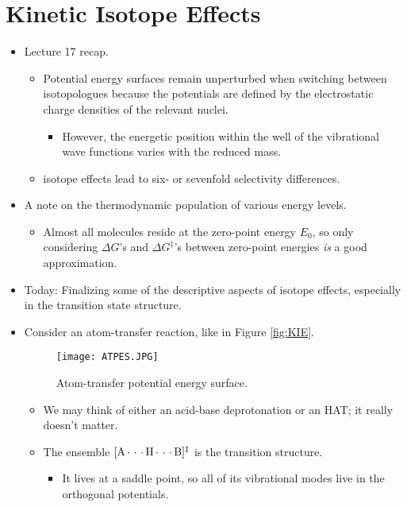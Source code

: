 \documentclass[../notes.tex]{subfiles}
\begin{document}
\section{Kinetic Isotope Effects}
\begin{itemize}
    \item {}Lecture 17 recap.
    \begin{itemize}
        \item Potential energy surfaces remain unperturbed when switching between isotopologues because the potentials are defined by the electrostatic charge densities of the relevant nuclei.
        \begin{itemize}
            \item However, the energetic position within the well of the vibrational wave functions varies with the reduced mass.
        \end{itemize}
        \item {} isotope effects lead to six- or sevenfold selectivity differences.
    \end{itemize}
    \item A note on the thermodynamic population of various energy levels.
    \begin{itemize}
        \item Almost all molecules reside at the zero-point energy $E_0$, so only considering $\Delta G$'s and $\Delta G^\ddagger$'s between zero-point energies \emph{is} a good approximation.
    \end{itemize}
    \item Today: Finalizing some of the descriptive aspects of isotope effects, especially in the transition state structure.
    \item Consider an atom-transfer reaction, like in Figure \ref{fig:KIE}.
    \begin{figure}[h!]
        \centering
        \texttt{[image: ATPES.JPG]}
        \caption{Atom-transfer potential energy surface.}
        \label{fig:ATPES}
    \end{figure}
    \begin{itemize}
        \item We may think of either an acid-base deprotonation or an HAT; it really doesn't matter.
        \item The ensemble $[\ce{A***H***B}]^\ddagger$ is the transition structure.
        \begin{itemize}
            \item It lives at a saddle point, so all of its vibrational modes live in the orthogonal potentials.

\end{itemize}
\end{itemize}
\end{itemize}
\end{document}
